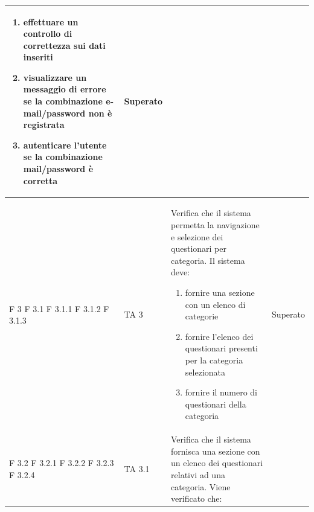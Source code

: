 \documentclass[a4paper,11pt]{article}
\begin{document}
\begin{longtable}{p{}p{}p{}p{}}
\begin{enumerate}
\item effettuare un controllo di correttezza sui dati inseriti
\item visualizzare un messaggio di errore se la combinazione e-mail/password non è registrata
\item autenticare l'utente se la combinazione mail/password è corretta
\end{enumerate} & Superato\\
\midrule
F 3 \newline F 3.1 \newline  F 3.1.1 \newline  F 3.1.2 \newline F 3.1.3& TA 3 &Verifica che il sistema permetta la navigazione e selezione dei questionari per categoria. Il sistema deve: 
\begin{enumerate}
\item fornire una sezione con un elenco di categorie
\item fornire l'elenco dei questionari presenti per la categoria selezionata
\item fornire il numero di questionari della categoria
\end{enumerate} & Superato\\
\midrule
F 3.2 \newline F 3.2.1 \newline  F 3.2.2 \newline  F 3.2.3 \newline F 3.2.4& TA 3.1 &Verifica che il sistema fornisca una sezione con un elenco dei questionari relativi ad una categoria. Viene verificato che: 

\end{longtable}
\end{document}
